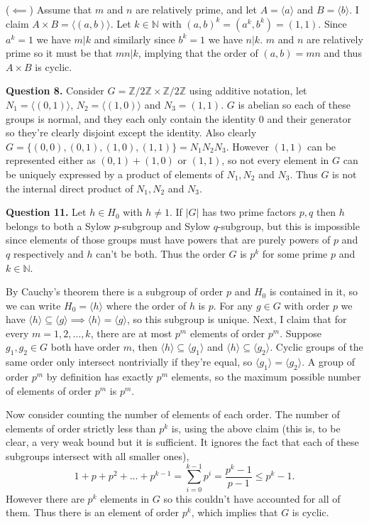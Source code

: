 \documentclass[letterpaper, reqno,11pt]{article}
\begin{document}
($\impliedby$) Assume that $m$ and $n$ are relatively prime, and let $A=\langle a \rangle $ and $B= \langle b \rangle $. I claim $A\times B= \langle (a,b) \rangle $. Let $k\in \mathbb{N}$ with $(a,b)^{k}=(a^{k},b^{k})=(1,1)$. Since $a^{k}=1$ we have $m|k$ and similarly since $b^{k}=1$ we have $n|k$. $m$ and $n$ are relatively prime so it must be that $mn|k$, implying that the order of $(a,b)=mn$ and thus $A\times B$ is cyclic.

{\medskip\noindent\bf Question 8.} Consider $G=\mathbb{Z}/2\mathbb{Z}\times \mathbb{Z}/2\mathbb{Z}$ using additive notation, let $N_1=\langle(0,1)\rangle$, $N_2= \langle (1,0) \rangle $ and $N_3=(1,1)$. $G$ is abelian so each of these groups is normal, and they each only contain the identity $0$ and their generator so they're clearly disjoint except the identity. Also clearly $G=\{(0,0),(0,1),(1,0),(1,1)\}=N_1N_2N_3$. However $(1,1)$ can be represented either as $(0,1)+(1,0)$ or $(1,1)$, so not every element in $G$ can be uniquely expressed by a product of elements of $N_1,N_2$ and $N_3$. Thus $G$ is not the internal direct product of $N_1,N_2$ and $N_3$.

{\medskip\noindent\bf Question 11.} Let $h\in H_0$ with $h\neq 1$. If $|G|$ has two prime factors $p,q$ then $h$ belongs to both a Sylow $p$-subgroup and Sylow $q$-subgroup, but this is impossible since elements of those groups must have powers that are purely powers of $p$ and $q$ respectively and $h$ can't be both. Thus the order $G$ is $p^{k}$ for some prime $p$ and $k\in \mathbb{N}$.

By Cauchy's theorem there is a subgroup of order $p$ and $H_0$ is contained in it, so we can write $H_0= \langle h \rangle $ where the order of $h$ is $p$. For any $g\in G$ with order $p$ we have $\langle h \rangle \subseteq \langle g \rangle \implies \langle h \rangle =\langle g \rangle $, so this subgroup is unique. Next, I claim that for every $m=1,2,\ldots,k$, there are at most $p^{m}$ elements of order $p^m$. Suppose $g_1,g_2\in G$ both have order $m$, then $\langle h \rangle \subseteq \langle g_1 \rangle $ and $\langle h \rangle \subseteq \langle g_2 \rangle $. Cyclic groups of the same order only intersect nontrivially if they're equal, so $\langle g_1 \rangle =\langle g_2 \rangle$. A group of order $p^{m}$ by definition has exactly $p^{m}$ elements, so the maximum possible number of elements of order $p^{m}$ is $p^{m}$.

Now consider counting the number of elements of each order. The number of elements of order strictly less than $p^{k}$ is, using the above claim (this is, to be clear, a very weak bound but it is sufficient. It ignores the fact that each of these subgroups intersect with all smaller ones),
\[
1+p+p^{2}+\ldots+p^{k-1}=\sum_{i=0}^{k-1}p^{i}=\frac{p^{k}-1}{p-1}\leq p^{k}-1
.\]
However there are $p^{k}$ elements in $G$ so this couldn't have accounted for all of them. Thus there is an element of order $p^{k}$, which implies that $G$ is cyclic.
\end{document}
